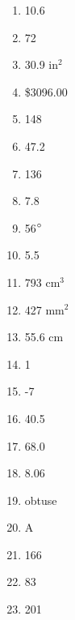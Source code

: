 \documentclass[../uilmath.tex]{subfiles}
\begin{document}
\begin{enumerate}[label=\bfseries\arabic*.]
    \item %
    10.6

    \item %
    72

    \item %
    30.9 in$^2$

    \item %
    \$3096.00

    \item %
    148

    \item %
    47.2

    \item %
    136

    \item %
    7.8

    \item %
    56$\degree$

    \item %
    5.5

    \item %
    793 cm$^3$

    \item %
    427 mm$^2$

    \item %
    55.6 cm
    
    \item %
    1

    \item %
    -7

    \item %
    40.5

    \item %
    68.0

    \item %
    8.06

    \item %
    obtuse 

    \item %
    A 

    \item %
    166

    \item %
    83

    \item %
    201


\end{enumerate}
\end{document}
